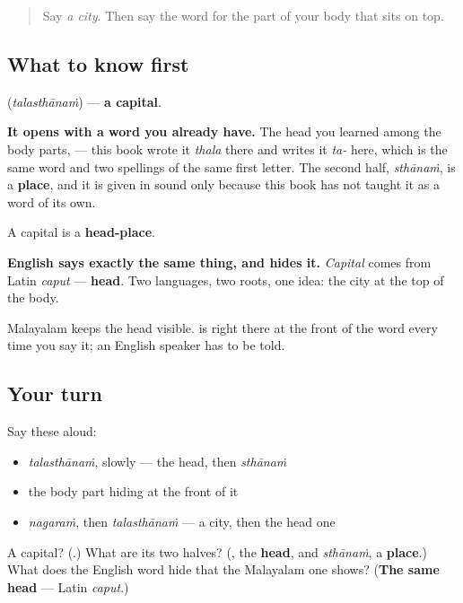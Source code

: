 \label{lesson:ML-C105-thalasthaanam}



\begin{quote}
Say \emph{a city}. Then say the word for the part of your body that sits on top.
\end{quote}

\subsection*{What to know first}
\textbf{} (\emph{talasthānaṁ}) — \textbf{a capital}.

\textbf{It opens with a word you already have.} The head you learned among the body parts, \textbf{} — this book wrote it \emph{thala} there and writes it \emph{ta-} here, which is the same word and two spellings of the same first letter. The second half, \emph{sthānaṁ}, is a \textbf{place}, and it is given in sound only because this book has not taught it as a word of its own.

A capital is a \textbf{head-place}.

\begin{culture}
\textbf{English says exactly the same thing, and hides it.} \emph{Capital} comes from Latin \emph{caput} — \textbf{head}. Two languages, two roots, one idea: the city at the top of the body.

Malayalam keeps the head visible. \textbf{} is right there at the front of the word every time you say it; an English speaker has to be told.
\end{culture}

\subsection*{Your turn}
Say these aloud:

\begin{itemize}
\raggedright
  \item \emph{talasthānaṁ}, slowly — the head, then \emph{sthānaṁ}
  \item the body part hiding at the front of it
  \item \emph{nagaraṁ}, then \emph{talasthānaṁ} — a city, then the head one
\end{itemize}

\begin{tcolorbox}[breakable,colback=teal!4,colframe=teal!35!black,title={Before you move on}]
A capital? (\textbf{}.) What are its two halves? (\textbf{}, the \textbf{head}, and \emph{sthānaṁ}, a \textbf{place}.) What does the English word hide that the Malayalam one shows? (\textbf{The same head} — Latin \emph{caput}.)
\end{tcolorbox}

